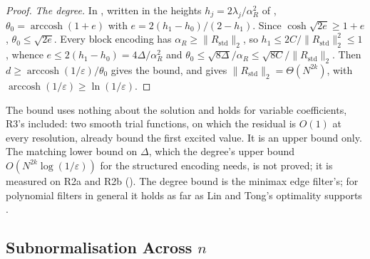 \begin{proof}
\emph{The degree.} In , written in the heights $h_j=2\lambda_j/\alpha_R^2$ of , $\theta_0=\operatorname{arccosh}(1+e)$ with $e=2(h_1-h_0)/(2-h_1)$. Since $\cosh\sqrt{2e}\ge1+e$, $\theta_0\le\sqrt{2e}$. Every block encoding has $\alpha_R\ge\|R_{\mathrm{std}}\|_2$, so $h_1\le2C/\|R_{\mathrm{std}}\|_2^2\le1$, whence $e\le2(h_1-h_0)=4\Delta/\alpha_R^2$ and $\theta_0\le\sqrt{8\Delta}/\alpha_R\le\sqrt{8C}/\|R_{\mathrm{std}}\|_2$. Then $d\ge\operatorname{arccosh}(1/\varepsilon)/\theta_0$ gives the bound, and  gives $\|R_{\mathrm{std}}\|_2=\Theta(N^{2k})$, with $\operatorname{arccosh}(1/\varepsilon)\ge\ln(1/\varepsilon)$.
\end{proof}

The bound uses nothing about the solution and holds for variable coefficients, R3's included: two smooth trial functions, on which the residual is $O(1)$ at every resolution, already bound the first excited value. It is an upper bound only. The matching lower bound on $\Delta$, which the degree's upper bound $O(N^{2k}\log(1/\varepsilon))$ for the structured encoding needs, is not proved; it is measured on R2a and R2b (). The degree bound is the minimax edge filter's; for polynomial filters in general it holds as far as Lin and Tong's optimality supports \cite{lintong2020groundstate}.

\subsection{Subnormalisation Across \texorpdfstring{$n$}{n}}
\label{app:alpha-G}

